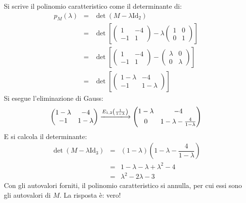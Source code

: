 \documentclass[a4paper]{article}
\makeatletter
\newenvironment{rowequmat}[1]{\left(\array{@{}#1@{}}}{\endarray\right)}
\makeatother
\begin{document}
	\noindent
	Si scrive il polinomio caratteristico come il determinante di:
	\begin{equation*}
		\begin{array}{lll}
			p_{M}\left(\lambda\right) &=& \det\left(M - \lambda\mathrm{Id}_{2}\right) \\ [1.5em]
			&=& \det\left[
				\begin{pmatrix}
					1	& -4 \\
					-1	& 1	 
				\end{pmatrix} - \lambda
				\begin{pmatrix}
					1 & 0 \\
					0 & 1 
				\end{pmatrix}
			\right] \\ [2.5em]
			&=& \det\left[
				\begin{pmatrix}
					1	& -4 \\
					-1	& 1	
				\end{pmatrix} -
				\begin{pmatrix}
					\lambda & 0 \\
					0 & \lambda 
				\end{pmatrix}
			\right] \\ [2.5em]
			&=& \det\left[
				\begin{pmatrix}
					1 - \lambda	& -4 \\
					-1	& 1	- \lambda
				\end{pmatrix}
			\right]
		\end{array}
	\end{equation*}
	Si esegue l'eliminazione di Gauss:
	\begin{equation*}
		\begin{pmatrix}
			1 - \lambda	& -4 \\
			-1	& 1	- \lambda
		\end{pmatrix}
		\xlongrightarrow{E_{1,2}\left(\frac{1}{1-\lambda}\right)}
		\begin{rowequmat}{cc}
			1 - \lambda	& -4 \\ [.3em]
			0	& 1	- \lambda - \frac{4}{1-\lambda}
		\end{rowequmat}
	\end{equation*}
	E si calcola il determinante:
	\begin{equation*}
		\begin{array}{lll}
			\det\left(M - \lambda \mathrm{Id}_{3}\right) &=& \left(1-\lambda\right) \left(1	- \lambda - \dfrac{4}{1-\lambda}\right) \\ [1em]
			&=& 1 - \lambda -\lambda +\lambda^{2} -4 \\ [1em]
			&=& \lambda^{2} -2 \lambda -3
		\end{array}
	\end{equation*}
	Con gli autovalori forniti, il polinomio caratteristico si annulla, per cui essi sono gli autovalori di $M$. La risposta è: vero!\newpage
\end{document}
